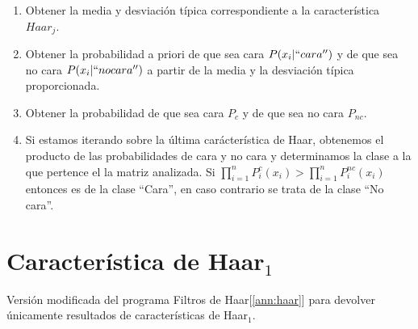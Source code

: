 \documentclass[10pt,a4paper]{article}
\begin{document}
\begin{enumerate}
\begin{enumerate}[label=\roman*]
\begin{itemize}
\begin{enumerate}[label=\roman*]
\item Obtener la media y desviación típica correspondiente a la característica $Haar_{j}$.
\item Obtener la probabilidad a priori de que sea cara $P (x_{i}|``cara'')$ y de que sea no cara $P(x_{i}|``no cara'')$ a partir de la media y la desviación típica proporcionada.
\item Obtener la probabilidad de que sea cara $P_{c}$ y de que sea no cara $P_{nc}$.
\item Si estamos iterando sobre la última carácterística de Haar, obtenemos el producto de las probabilidades de cara y no cara y determinamos la clase a la que pertence el la matriz analizada. Si 
$
  \prod_{i = 1}^{n} P_{i}^c(x_{i}) >  \prod_{i = 1}^{n} P_{i}^{nc}(x_{i})
$ entonces es de la clase ``Cara'', en caso contrario se trata de la clase ``No cara''.
\end{enumerate}
\end{itemize}
\end{enumerate}
\end{enumerate}

\vspace{10px}
\section{Característica de Haar$_{1}$}
\label{ann:haar2}
Versión modificada del programa Filtros de Haar[\ref{ann:haar}] para devolver únicamente resultados de características de Haar$_{1}$.


\end{document}
